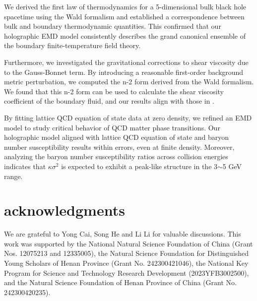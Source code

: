 \documentclass[a4paper,12pt]{article}
\numberwithin{equation}{section}
\begin{document}
We derived the first law of thermodynamics for a 5-dimensional bulk black hole spacetime using the Wald formalism and established a correspondence between bulk and boundary thermodynamic quantities. This confirmed that our holographic EMD model consistently describes the grand canonical ensemble of the boundary finite-temperature field theory.

Furthermore, we investigated the gravitational corrections to shear viscosity due to the Gauss-Bonnet term. By introducing a reasonable first-order background metric perturbation, we computed the n-2 form derived from the Wald formalism. We found that this n-2 form can be used to calculate the shear viscosity coefficient of the boundary fluid, and our results align with those in \cite{Charmousis:2012dw,Brigante:2007nu}.

By fitting lattice QCD equation of state data at zero density, we refined an EMD model to study critical behavior of QCD matter phase transitions. Our holographic model aligned with lattice QCD equation of state and baryon number susceptibility results within errors, even at finite density. Moreover, analyzing the baryon number susceptibility ratios across collision energies indicates that $\kappa\sigma^2$ is expected to exhibit a peak-like structure in the 3$\sim$5 GeV range.

\section{acknowledgments}
We are grateful to Yong Cai, Song He and Li Li for valuable discussions. This work was supported by the National Natural Science Foundation of China (Grant Nos. 12075213 and 12335005), the Natural Science Foundation for Distinguished Young Scholars of Henan Province (Grant No. 242300421046), the National Key Program for Science and Technology Research Development (2023YFB3002500), and the Natural Science Foundation of Henan Province of China (Grant No. 242300420235).
\end{document}
